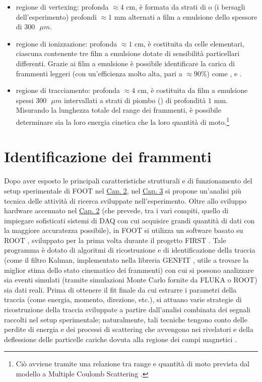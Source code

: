\documentclass[12pt,a4paper,twoside]{report}
\begin{document}
	\begin{itemize}
		\item regione di vertexing: profonda $\approx4\mbox{ cm}$, è formata da strati di  o  (i bersagli dell'esperimento) profondi $\approx1\mbox{ mm}$ alternati a film a emulsione dello spessore di $300\mbox{ }\mu{m}$.
		\item regione di ionizzazione: profonda $\approx1\mbox{ cm}$, è costituita da celle elementari, ciascuna contenente tre film a emulsione dotate di sensibilità particellari differenti. Grazie ai film a emulsione è possibile identificare la carica di frammenti leggeri (con un'efficienza molto alta, pari a $\approx90\%$) come ,  e  \cite{deLellisConference}.
		\item regione di tracciamento: profonda $\approx4\mbox{ cm}$, è costituita da film a emulsione spessi $300\mbox{ }\mu{m}$ intervallati a strati di piombo () di profondità $1\mbox{ mm}$. Misurando la lunghezza totale del range dei frammenti, è possibile determinare sia la loro energia cinetica che la loro quantità di moto.\footnote{Ciò avviene tramite una relazione tra range e quantità di moto prevista dal modello a Multiple Coulomb Scattering \cite{articleAgafonova,DESERIO2003539}.}
	\end{itemize}
	
	\chapter{Identificazione dei frammenti}\label{cap:3}
	Dopo aver esposto le principali caratteristiche strutturali e di funzionamento del setup sperimentale di FOOT nel \hyperref[cap:2]{Cap. 2}, nel \hyperref[cap:3]{Cap. 3} si propone un'analisi più tecnica delle attività di ricerca sviluppate nell'esperimento. Oltre allo sviluppo hardware accennato nel \hyperref[cap:2]{Cap. 2} (che prevede, tra i vari compiti, quello di impiegare sofisticati sistemi di DAQ con cui acquisire grandi quantità di dati con la maggiore accuratezza possibile), in FOOT si utilizza un software basato su ROOT \cite{rene_brun}, sviluppato per la prima volta durante il progetto FIRST \cite{foot_cdr}. Tale programma è dotato di algoritmi di ricostruzione e di identificazione della traccia (come il filtro Kalman, implementato nella libreria GENFIT \cite{Rauch_2015}, utile a trovare la miglior stima dello stato cinematico dei frammenti) con cui si possono analizzare sia eventi simulati (tramite simulazioni Monte Carlo fornite da FLUKA o ROOT) sia dati reali. Prima di ottenere il fit finale da cui estrarre i parametri della traccia (come energia, momento, direzione, etc.), si attuano varie strategie di ricostruzione della traccia sviluppate a partire dall'analisi combinata dei segnali raccolti nel setup sperimentale; naturalmente, tali tecniche tengono conto delle perdite di energia e dei processi di scattering che avvengono nei rivelatori e della deflessione delle particelle cariche dovuta alla regione dei campi magnetici \cite{ridolfiArticle}.
	
\end{document}
